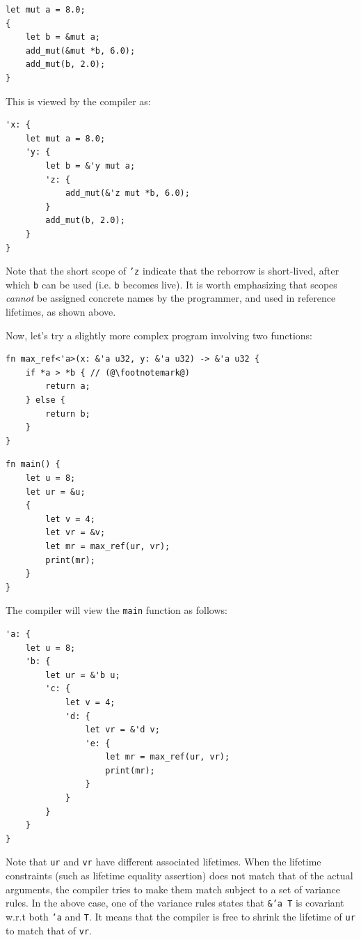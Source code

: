 \documentclass[11pt]{report}
\begin{document}
\begin{lstlisting}
let mut a = 8.0;
{
    let b = &mut a;
    add_mut(&mut *b, 6.0);
    add_mut(b, 2.0);
}
\end{lstlisting}

\noindent This is viewed by the compiler as:

\begin{lstlisting}
'x: {
    let mut a = 8.0;
    'y: {
        let b = &'y mut a;
        'z: {
            add_mut(&'z mut *b, 6.0);
        }
        add_mut(b, 2.0);
    }
}
\end{lstlisting}

Note that the short scope of \texttt{'z} indicate that the reborrow is short-lived, after which \texttt{b} can be used (i.e. \texttt{b} becomes live). It is worth emphasizing that scopes \textit{cannot} be assigned concrete names by the programmer, and used in reference lifetimes, as shown above.

Now, let's try a slightly more complex program involving two functions:

\begin{lstlisting}
fn max_ref<'a>(x: &'a u32, y: &'a u32) -> &'a u32 {
    if *a > *b { // (@\footnotemark@)
        return a;
    } else {
        return b;
    }
}
\end{lstlisting}

\begin{lstlisting}
fn main() {
    let u = 8;
    let ur = &u;
    {
        let v = 4;
        let vr = &v;
        let mr = max_ref(ur, vr);
        print(mr);
    }
}
\end{lstlisting}

The compiler will view the \texttt{main} function as follows:

\begin{lstlisting}
'a: {
    let u = 8;
    'b: {
        let ur = &'b u;
        'c: {
            let v = 4;
            'd: {
                let vr = &'d v;
                'e: {
                    let mr = max_ref(ur, vr);
                    print(mr);
                }
            }
        }
    }
}
\end{lstlisting}

Note that \texttt{ur} and \texttt{vr} have different associated lifetimes. When the lifetime constraints (such as lifetime equality assertion) does not match that of the actual arguments, the compiler tries to make them match subject to a set of variance rules. In the above case, one of the variance rules states that \texttt{\&'a T} is covariant w.r.t both \texttt{'a} and \texttt{T}. It means that the compiler is free to shrink the lifetime of \texttt{ur} to match that of \texttt{vr}.
\end{document}
